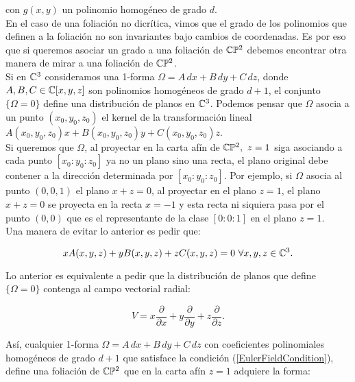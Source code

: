 \noindent con $g(x,y)$ un polinomio homogéneo de grado $d$.\\

En el caso de una foliación no dicrítica, vimos que el grado de los polinomios que definen a la foliación no son invariantes bajo cambios de coordenadas. Es por eso que si queremos asociar un grado a una foliación de $\mathbb{C}\mathbb{P}^{2}$ debemos encontrar otra manera de mirar a una foliación de $\mathbb{C}\mathbb{P}^{2}$.\\

Si en $\mathbb{C}^{3}$ consideramos una 1-forma $\Omega=A\, dx+B\, dy+C\, dz$, donde $A,B,C\in\mathbb{C}[x,y,z]$ son polinomios homogéneos de grado $d+1$, el conjunto $\{\Omega=0\}$ define una distribución de planos en $\mathbb{C}^{3}$. Podemos pensar que $\Omega$ asocia a un punto $(x_{0},y_{0},z_{0})$ el kernel de la transformación lineal $A(x_{0},y_{0},z_{0})x+B(x_{0},y_{0},z_{0})y+C(x_{0},y_{0},z_{0})z$.\\

Si queremos que $\Omega$, al proyectar en la carta afín de $\mathbb{C}\mathbb{P}^{2},\ z=1$ siga asociando a cada punto $[x_{0}:y_{0}:z_{0}]$ ya no un plano sino una recta, el plano original debe contener a la dirección determinada por $[x_{0}:y_{0}:z_{0}]$. Por ejemplo, si $\Omega$ asocia al punto $(0,0,1)$ el plano $x+z=0$, al proyectar en el plano $z=1$, el plano $x+z=0$ se proyecta en la recta $x=-1$ y esta recta ni siquiera pasa por el punto $(0,0)$ que es el representante de la clase $[0:0:1]$ en el plano $z=1$.\\

Una manera de evitar lo anterior es pedir que:

\begin{equation}
\label{EulerFieldCondition}
xA(x,y,z)+yB(x,y,z)+zC(x,y,z)=0 \,\, \forall x,y,z\in\mathbb{C}^{3}.
\end{equation}

\noindent Lo anterior es equivalente a pedir que la distribución de planos que define $\{\Omega=0\}$ contenga al campo vectorial radial:

\begin{equation}
\label{RadialVectorField}
V=x\frac{\partial}{\partial x}+y\frac{\partial}{\partial y}+z\frac{\partial}{\partial z}.
\end{equation}

\noindent Así, cualquier 1-forma $\Omega=A\, dx+B\, dy+C\, dz$ con coeficientes polinomiales homogéneos de grado $d+1$ que satisface la condición (\ref{EulerFieldCondition}), define una foliación de $\mathbb{C}\mathbb{P}^{2}$ que en la carta afín $z=1$ adquiere la forma:

